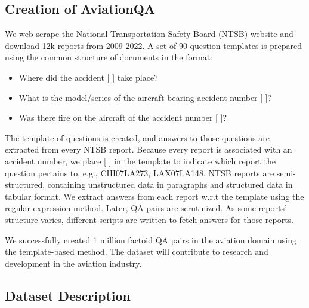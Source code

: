 \documentclass[11pt]{article}
\begin{document}
\subsection{Creation of AviationQA}\label{aviationQA}

We web scrape the National Transportation Safety Board (NTSB) website and download 12k reports from 2009-2022. A set of 90 question templates is prepared using the common structure of documents in the format:
\begin{itemize}
    \item Where did the accident [ ] take place?
    
    \item What is the model/series of the aircraft bearing accident number [ ]? 
    
    \item Was there fire on the aircraft of the accident number [ ]?
\end{itemize}
 The template of questions is created, and answers to those questions are extracted from every NTSB report. Because every report is associated with an accident number, we place [ ] in the template to indicate which report the question pertains to, e.g., CHI07LA273, LAX07LA148.
NTSB reports are semi-structured, containing unstructured data in paragraphs and structured data in tabular format. We extract answers from each report w.r.t the template using the regular expression method.
 Later, QA pairs are scrutinized. As some reports' structure varies, different scripts are written to fetch answers for those reports. 
\par
We successfully created 1 million factoid QA pairs in the aviation domain using the template-based method. The dataset will contribute to research and development in the aviation industry.

\subsection{Dataset Description}

\label{data_descp}
\end{document}
